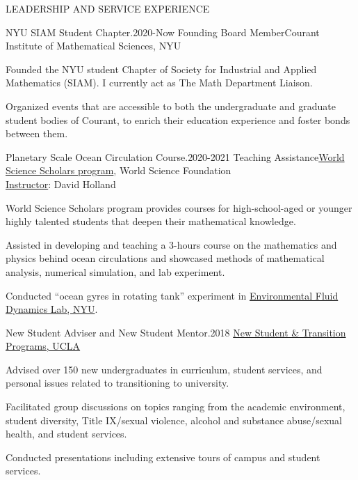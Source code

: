 \documentclass{resume} %
\begin{document}

\begin{rSection}{LEADERSHIP AND SERVICE EXPERIENCE}
\begin{rSubsection}{NYU SIAM Student Chapter.}{2020-Now}
{Founding Board Member}{Courant Institute of Mathematical Sciences, NYU}
\item Founded the NYU student Chapter of Society for Industrial and Applied Mathematics (SIAM). I currently act as The Math Department Liaison.
\item Organized events that are accessible to both the undergraduate and graduate student bodies of Courant, to enrich their education experience and foster bonds between them.
\end{rSubsection}

\begin{rSubsection}{Planetary Scale Ocean Circulation Course.}{2020-2021}
{Teaching Assistance}{\href{https://www.worldsciencefestival.com/education/world-science-scholars/}{World Science Scholars program}, World Science Foundation\\\underline{Instructor}: David Holland}
\item World Science Scholars program provides courses for high-school-aged or younger highly talented students that deepen their mathematical knowledge.
\item Assisted in developing and teaching a 3-hours course on the mathematics and physics behind ocean circulations and showcased methods of mathematical analysis, numerical simulation, and lab experiment.
\item Conducted ``ocean gyres in rotating tank'' experiment in \href{http://www.efdlhome.org/}{Environmental Fluid Dynamics Lab, NYU}.
\end{rSubsection}

\begin{rSubsection}{New Student Adviser and New Student Mentor.}{2018}
{\phantom{text}}{\href{http://newstudents.ucla.edu/}{New Student \& Transition Programs, UCLA}}
\item Advised over 150 new undergraduates in curriculum, student services, and personal issues related to transitioning to university.
\item Facilitated group discussions on topics ranging from the academic environment, student diversity, Title IX/sexual violence, alcohol and substance abuse/sexual health, and student services.
\item Conducted presentations including extensive tours of campus and student services.
\end{rSubsection}
\end{rSection}
\end{document}

